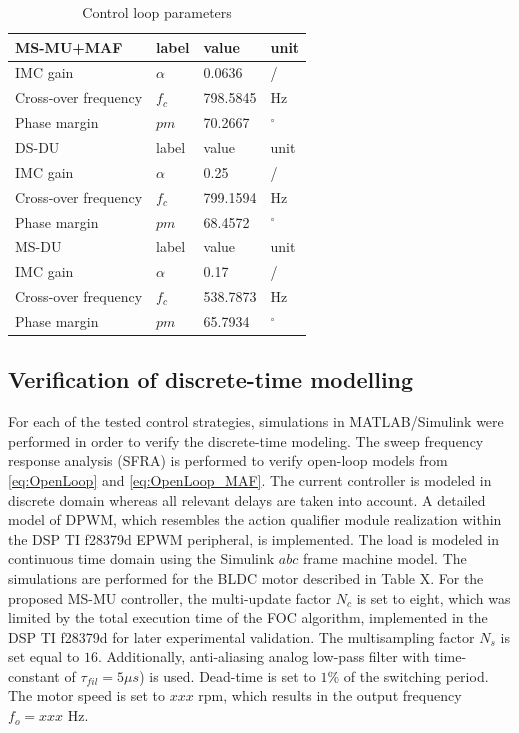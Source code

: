 \documentclass[journal]{IEEEtran}
\begin{document}
\begin{table}[h!]
			  \caption{Control loop parameters}
              \label{tab:an_param}
              \centering
              \begin{tabular}{llll}
                           \midrule\midrule
        MS-MU+MAF & label & value   & unit\\
        \midrule               
                  IMC gain	& $\alpha$ & 0.0636 & /\\  
                  Cross-over frequency  & $f_{c}$ & 798.5845 & Hz   \\
                  Phase margin  & $pm$ & 70.2667 &  $^\circ$  \\
                  \midrule\midrule
        DS-DU & label & value   & unit\\
        \midrule               
                  IMC gain	& $\alpha$ & 0.25 & /\\  
                  Cross-over frequency  & $f_{c}$ & 799.1594 & Hz   \\
                  Phase margin  & $pm$ & 68.4572 &  $^\circ$  \\
                  \midrule\midrule
        MS-DU & label & value   & unit\\
        \midrule               
                  IMC gain	& $\alpha$ & 0.17 & /\\  
                  Cross-over frequency  & $f_{c}$ & 538.7873 & Hz   \\
                  Phase margin  & $pm$ & 65.7934 &  $^\circ$  \\
                  \midrule\midrule
                                                        
              \end{tabular}
\end{table}

\subsection{Verification of discrete-time modelling}
For each of the tested control strategies, simulations in MATLAB/Simulink were performed in order to verify the discrete-time modeling. 
The sweep frequency response analysis (SFRA) is performed to verify open-loop models from \eqref{eq:OpenLoop} and \eqref{eq:OpenLoop_MAF}.
The current controller is modeled in discrete domain whereas all relevant delays are taken into account. A detailed model of DPWM, which resembles the action qualifier module realization within the DSP TI f28379d EPWM peripheral, is implemented. The load is modeled in continuous time domain using the Simulink $abc$ frame machine model. The simulations are performed for the BLDC motor described in Table X. For the proposed MS-MU controller, the multi-update factor $N_c$ is set to eight, which was limited by the total execution time of the FOC algorithm, implemented in the DSP TI f28379d for later experimental validation. The multisampling factor $N_s$ is set equal to $16$. Additionally, anti-aliasing analog low-pass filter with time-constant of $\tau_{fil} = 5 \mu s$) is used. Dead-time is set to $1 \%$ of the switching period. The motor speed is set to $xxx$ rpm, which results in the output frequency $f_o = xxx$ Hz.
\end{document}
